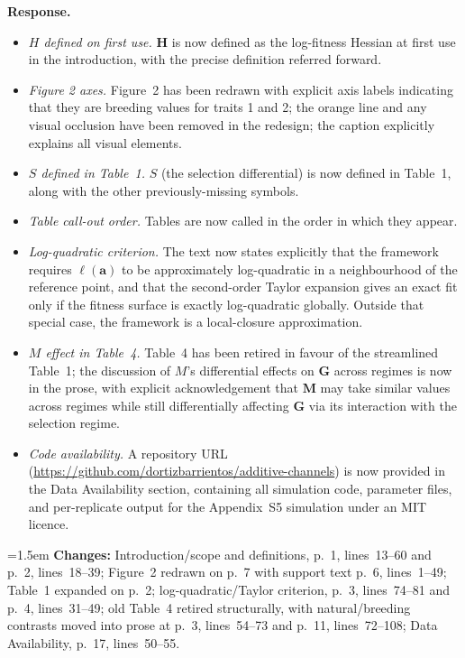 \documentclass[11pt,a4paper]{article}
\newcommand{\response}{%
  \par\medskip\noindent\textbf{\color{ResponseColor}Response.}\quad\ignorespaces
}
\newcommand{\changesat}[1]{%
  \par\smallskip\noindent\hangindent=1.5em\hangafter=1
  \textbf{\color{ChangeColor}Changes:} \quad #1\par\medskip
}
\newcommand{\mat}[1]{\ensuremath{\mathbf{#1}}}
\newcommand{\vect}[1]{\ensuremath{\bm{#1}}}
\begin{document}
\response
\begin{itemize}[leftmargin=*]
  \item \textit{$H$ defined on first use.} $\mat{H}$ is now defined as the log-fitness Hessian at first use in the introduction, with the precise definition referred forward.
  \item \textit{Figure 2 axes.} Figure~2 has been redrawn with explicit axis labels indicating that they are breeding values for traits 1 and 2; the orange line and any visual occlusion have been removed in the redesign; the caption explicitly explains all visual elements.
  \item \textit{$S$ defined in Table~1.} $S$ (the selection differential) is now defined in Table~1, along with the other previously-missing symbols.
  \item \textit{Table call-out order.} Tables are now called in the order in which they appear.
  \item \textit{Log-quadratic criterion.} The text now states explicitly that the framework requires $\ell(\vect{a})$ to be approximately log-quadratic in a neighbourhood of the reference point, and that the second-order Taylor expansion gives an exact fit only if the fitness surface is exactly log-quadratic globally. Outside that special case, the framework is a local-closure approximation.
  \item \textit{$M$ effect in Table~4.} Table~4 has been retired in favour of the streamlined Table~1; the discussion of $M$'s differential effects on $\mat{G}$ across regimes is now in the prose, with explicit acknowledgement that $\mat{M}$ may take similar values across regimes while still differentially affecting $\mat{G}$ via its interaction with the selection regime.
  \item \textit{Code availability.} A repository URL (\url{https://github.com/dortizbarrientos/additive-channels}) is now provided in the Data Availability section, containing all simulation code, parameter files, and per-replicate output for the Appendix~S5 simulation under an MIT licence.
\end{itemize}

\changesat{Introduction/scope and definitions, p.~1, lines~13--60 and p.~2, lines~18--39; Figure~2 redrawn on p.~7 with support text p.~6, lines~1--49; Table~1 expanded on p.~2; log-quadratic/Taylor criterion, p.~3, lines~74--81 and p.~4, lines~31--49; old Table~4 retired structurally, with natural/breeding contrasts moved into prose at p.~3, lines~54--73 and p.~11, lines~72--108; Data Availability, p.~17, lines~50--55.}
\end{document}
